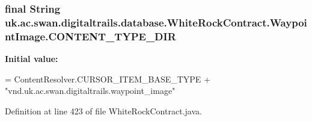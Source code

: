 \hypertarget{classuk_1_1ac_1_1swan_1_1digitaltrails_1_1database_1_1_white_rock_contract_1_1_waypoint_image_ae9b3cb4696bf5eeb848ac36e88ae7204}{
\subsubsection[{C\+O\+N\+T\+E\+N\+T\+\_\+\+T\+Y\+P\+E\+\_\+\+D\+I\+R}]{\setlength{\rightskip}{0pt plus 5cm}final String uk.\+ac.\+swan.\+digitaltrails.\+database.\+White\+Rock\+Contract.\+Waypoint\+Image.\+C\+O\+N\+T\+E\+N\+T\+\_\+\+T\+Y\+P\+E\+\_\+\+D\+I\+R\hspace{0.3cm}{\ttfamily [static]}}}\label{classuk_1_1ac_1_1swan_1_1digitaltrails_1_1database_1_1_white_rock_contract_1_1_waypoint_image_ae9b3cb4696bf5eeb848ac36e88ae7204}
{\bfseries Initial value\+:}
\begin{DoxyCode}
= ContentResolver.CURSOR\_ITEM\_BASE\_TYPE +
                \textcolor{stringliteral}{"vnd.uk.ac.swan.digitaltrails.waypoint\_image"}
\end{DoxyCode}


Definition at line 423 of file White\+Rock\+Contract.\+java.

